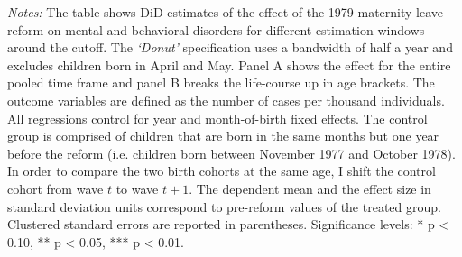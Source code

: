 \begin{landscape}
\begin{table}[H]
\begin{threeparttable}
 		\begin{tablenotes} 
 			\item \scriptsize \emph{Notes:} The table shows DiD estimates of the effect of the 1979 maternity leave reform on mental and behavioral disorders for different estimation windows around the cutoff. The \textit{`Donut'} specification uses a bandwidth of half a year and excludes children born in April and May. Panel A shows the effect for the entire pooled time frame and panel B breaks the life-course up in age brackets. The outcome variables are defined as the number of cases per thousand individuals. All regressions control for year and month-of-birth fixed effects. The control group is comprised of children that are born in the same months but one year before the reform (i.e. children born between November 1977 and October 1978). In order to compare the two birth cohorts at the same age, I shift the control cohort from wave $t$ to wave $t+1$. The dependent mean and the effect size in standard deviation units correspond to pre-reform values of the treated group. Clustered standard errors are reported in parentheses. \newline Significance levels: * p < 0.10, ** p < 0.05, *** p < 0.01. \newline 	%
 		\end{tablenotes} 
 	\end{threeparttable} 
 \end{table}
\vspace*{\fill}\clearpage 
\end{landscape}
